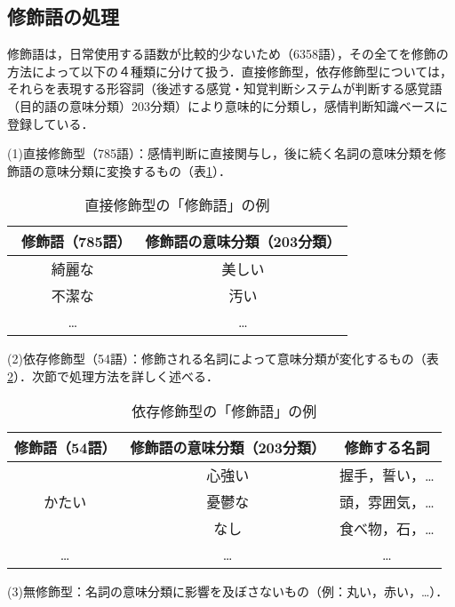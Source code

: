 \documentclass[japanese]{jnlp_1.3a}
\begin{document}
\subsection{修飾語の処理}
修飾語は，日常使用する語数が比較的少ないため（6358語），その全てを修飾の方法によって以下の４種類に分けて扱う．直接修飾型，依存修飾型については，それらを表現する形容詞（後述する感覚・知覚判断システムが判断する感覚語（目的語の意味分類）203分類）により意味的に分類し，感情判断知識ベースに登録している．

(1)直接修飾型（785語）：感情判断に直接関与し，後に続く名詞の意味分類を修飾語の意味分類に変換するもの（表\ref{example_of_direct_shuushoku}）．

\begin{table}[b]
\caption{直接修飾型の「修飾語」の例}
\label{example_of_direct_shuushoku}
\begin{center}
\begin{tabular}{|c|c|} \hline
修飾語（785語）　 & 修飾語の意味分類（203分類） \\ \hline\hline
綺麗な & 美しい \\ \hline
不潔な & 汚い \\ \hline
… & … \\ \hline
\end{tabular}
\end{center}
\end{table}


(2)依存修飾型（54語）：修飾される名詞によって意味分類が変化するもの（表\ref{Example_of_dependence_modification}）．次節で処理方法を詳しく述べる．

\begin{table}[b]
\caption{依存修飾型の「修飾語」の例}
\label{Example_of_dependence_modification}
\begin{center}
\begin{tabular}{|c|c|c|} \hline
修飾語（54語） & 修飾語の意味分類（203分類） & 修飾する名詞\\ \hline\hline
　 & 心強い & 握手，誓い，… \\
かたい & 憂鬱な & 頭，雰囲気，… \\
　 & なし & 食べ物，石，… \\ \hline
… & … & … \\ \hline
\end{tabular}
\end{center}
\end{table}


(3)無修飾型：名詞の意味分類に影響を及ぼさないもの（例：丸い，赤い，…）．
\end{document}
